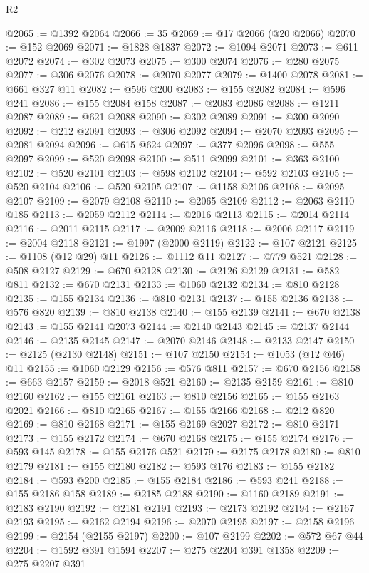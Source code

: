 \begin{lexlean}{R2}
\begin{coremodule}
@2065 := @1392 @2064
@2066 := 35
@2069 := @17 @2066 (@20 @2066)
@2070 := @152 @2069
@2071 := @1828 @1837
@2072 := @1094 @2071
@2073 := @611 @2072
@2074 := @302 @2073
@2075 := @300 @2074
@2076 := @280 @2075
@2077 := @306 @2076
@2078 := @2070 @2077
@2079 := @1400 @2078
@2081 := @661 @327 @11
@2082 := @596 @200
@2083 := @155 @2082
@2084 := @596 @241
@2086 := @155 @2084 @158
@2087 := @2083 @2086
@2088 := @1211 @2087
@2089 := @621 @2088
@2090 := @302 @2089
@2091 := @300 @2090
@2092 := @212 @2091
@2093 := @306 @2092
@2094 := @2070 @2093
@2095 := @2081 @2094
@2096 := @615 @624
@2097 := @377 @2096
@2098 := @555 @2097
@2099 := @520 @2098
@2100 := @511 @2099
@2101 := @363 @2100
@2102 := @520 @2101
@2103 := @598 @2102
@2104 := @592 @2103
@2105 := @520 @2104
@2106 := @520 @2105
@2107 := @1158 @2106
@2108 := @2095 @2107
@2109 := @2079 @2108
@2110 := @2065 @2109
@2112 := @2063 @2110 @185
@2113 := @2059 @2112
@2114 := @2016 @2113
@2115 := @2014 @2114
@2116 := @2011 @2115
@2117 := @2009 @2116
@2118 := @2006 @2117
@2119 := @2004 @2118
@2121 := @1997 (@2000 @2119)
@2122 := @107 @2121
@2125 := @1108 (@12 @29) @11
@2126 := @1112 @11
@2127 := @779 @521
@2128 := @508 @2127
@2129 := @670 @2128
@2130 := @2126 @2129
@2131 := @582 @811
@2132 := @670 @2131
@2133 := @1060 @2132
@2134 := @810 @2128
@2135 := @155 @2134
@2136 := @810 @2131
@2137 := @155 @2136
@2138 := @576 @820
@2139 := @810 @2138
@2140 := @155 @2139
@2141 := @670 @2138
@2143 := @155 @2141 @2073
@2144 := @2140 @2143
@2145 := @2137 @2144
@2146 := @2135 @2145
@2147 := @2070 @2146
@2148 := @2133 @2147
@2150 := @2125 (@2130 @2148)
@2151 := @107 @2150
@2154 := @1053 (@12 @46) @11
@2155 := @1060 @2129
@2156 := @576 @811
@2157 := @670 @2156
@2158 := @663 @2157
@2159 := @2018 @521
@2160 := @2135 @2159
@2161 := @810 @2160
@2162 := @155 @2161
@2163 := @810 @2156
@2165 := @155 @2163 @2021
@2166 := @810 @2165
@2167 := @155 @2166
@2168 := @212 @820
@2169 := @810 @2168
@2171 := @155 @2169 @2027
@2172 := @810 @2171
@2173 := @155 @2172
@2174 := @670 @2168
@2175 := @155 @2174
@2176 := @593 @145
@2178 := @155 @2176 @521
@2179 := @2175 @2178
@2180 := @810 @2179
@2181 := @155 @2180
@2182 := @593 @176
@2183 := @155 @2182
@2184 := @593 @200
@2185 := @155 @2184
@2186 := @593 @241
@2188 := @155 @2186 @158
@2189 := @2185 @2188
@2190 := @1160 @2189
@2191 := @2183 @2190
@2192 := @2181 @2191
@2193 := @2173 @2192
@2194 := @2167 @2193
@2195 := @2162 @2194
@2196 := @2070 @2195
@2197 := @2158 @2196
@2199 := @2154 (@2155 @2197)
@2200 := @107 @2199
@2202 := @572 @67 @44
@2204 := @1592 @391 @1594
@2207 := @275 @2204 @391 @1358
@2209 := @275 @2207 @391

\end{coremodule}
\end{lexlean}
